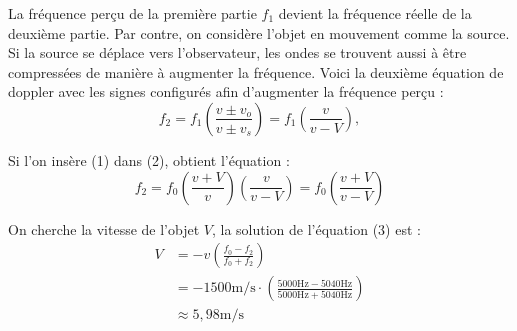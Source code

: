 \documentclass[11pt]{article}
\begin{document}
La fréquence perçu de la première partie $f_1$ devient la fréquence réelle de la deuxième partie. Par contre, on considère l'objet en mouvement comme la source. Si la source se déplace vers l'observateur, les ondes se trouvent aussi à être compressées de manière à augmenter la fréquence. Voici la deuxième équation de doppler avec les signes configurés afin d'augmenter la fréquence perçu :
\begin{equation}
f_2=f_1\left(\frac{v\pm v_o}{v\pm v_s}\right)=f_1\left(\frac{v}{v-V}\right),
\end{equation}

Si l'on insère (1) dans (2), obtient l'équation :
\begin{equation}
f_2=f_0\left(\frac{v+V}{v}\right)\left(\frac{v}{v-V}\right)=f_0\left(\frac{v+V}{v-V}\right)
\end{equation}

On cherche la vitesse de l'objet $V$, la solution de l'équation (3) est :
\begin{equation}
\begin{split}
V&=-v\left(\frac{f_0-f_2}{f_0+f_2}\right)\\
 &=-1500\mathrm{m/s}\cdot\left(\frac{5000\mathrm{Hz}-5040\mathrm{Hz}}{5000\mathrm{Hz}+5040\mathrm{Hz}}\right)\\
 &\approx5,98\mathrm{m/s}
\end{split}
\end{equation}
\end{document}

